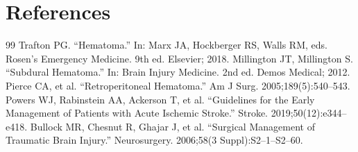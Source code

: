 \section*{References}
\begin{thebibliography}{99}
 Trafton PG. ``Hematoma.'' In: Marx JA, Hockberger RS, Walls RM, eds. Rosen's Emergency Medicine. 9th ed. Elsevier; 2018.
 Millington JT, Millington S. ``Subdural Hematoma.'' In: Brain Injury Medicine. 2nd ed. Demos Medical; 2012.
 Pierce CA, et al. ``Retroperitoneal Hematoma.'' Am J Surg. 2005;189(5):540--543.
 Powers WJ, Rabinstein AA, Ackerson T, et al. ``Guidelines for the Early Management of Patients with Acute Ischemic Stroke.'' Stroke. 2019;50(12):e344--e418.
 Bullock MR, Chesnut R, Ghajar J, et al. ``Surgical Management of Traumatic Brain Injury.'' Neurosurgery. 2006;58(3 Suppl):S2--1--S2--60.
\end{thebibliography}
